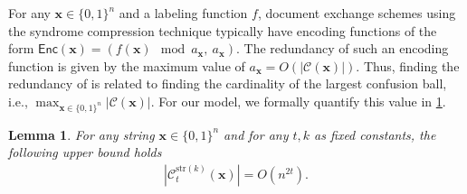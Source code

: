 \documentclass[onecolumn]{IEEEtran}
\newtheorem{lemma}{Lemma}
\newcommand{\bl}{n}
\newcommand{\numedits}{t}
\newcommand{\editsize}{k}
\newcommand{\confball}[3]{\mathcal{C}_{#1}^{#2}(#3)}
\newcommand{\encode}{\mathsf{Enc}}
\newcommand{\bfx}{{\mathbf{ x}}}
\newcommand{\cC}{\mathcal{C}}
\begin{document}
For any $\bfx \in \{0,1\}^\bl$ and a labeling function $f$, document exchange schemes using the syndrome compression technique typically have encoding functions of the form $\encode(\bfx) = (f(\bfx) \mod {a_\bfx}, ~a_\bfx)$. The redundancy of such an encoding function is given by the maximum value of $a_\bfx = O(|\cC(\bfx)|)$. Thus, finding the redundancy of is related to finding the cardinality of the largest confusion ball, i.e., $\max_{\bfx \in \{0,1\}^n} |\cC(\bfx)|$. For our model, we formally quantify this value in \cref{lem:confusion ball general case}.
\begin{lemma}
\label{lem:confusion ball general case}
    For any string $\mathbf{x} \in \{0,1\}^\bl$ and for any $\numedits,\editsize$ as fixed constants, the following upper bound holds
    \begin{align*}
        |\confball{\numedits}{\mathrm{str}(\editsize)}{\mathbf{x}}| = O(\bl^{2\numedits}).
    \end{align*}  
\end{lemma}
\end{document}
